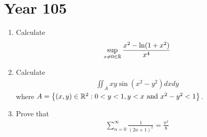 \documentclass{report}
\begin{document}
\section{Year 105}
\begin{question}{}{}
\begin{enumerate}[label=(\roman*)]
  \item Calculate 
    \begin{align*}
    \sup_{x\neq 0\in\mathbb{R}} \frac{x^2- \ln (1+x^2)}{x^4} 
    \end{align*} 
  \item Calculate 
\begin{align*}
\iint_A xy \sin (x^2-y^2)dxdy
\end{align*}
where $A= \left\{ (x,y)\in\mathbb{R}^2: 0 <y<1,y<x\text{ and }x^2-y^2<1 \right\}$.  
\item Prove that 
  \begin{align*}
  \sum_{n=0}^{\infty} \frac{1}{(2n+1)^2}= \frac{\pi ^2}{8}
  \end{align*}
\end{enumerate}
\end{question}
\end{document}
